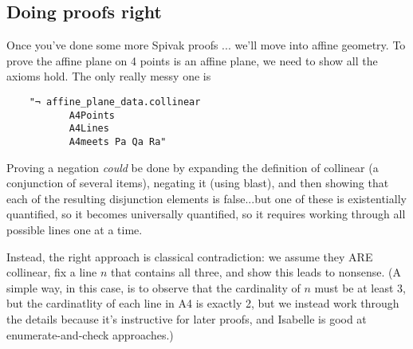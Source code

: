 \subsection{Doing proofs right}
Once you've done some more Spivak proofs ... we'll move into affine geometry. 
To prove the affine plane on 4 points is an affine plane, we need to show all the axioms hold. The only really messy one is 
\begin{verbatim}
    "¬ affine_plane_data.collinear
           A4Points
           A4Lines
           A4meets Pa Qa Ra"
\end{verbatim}
Proving a negation \textit{could} be done by expanding the definition of collinear (a conjunction of several items), negating it (using blast), and then showing that each of the resulting disjunction elements is false...but one of these is existentially quantified, so it becomes universally quantified, so it requires working through all possible lines one at a time. 

Instead, the right approach is classical contradiction: we assume they ARE collinear, fix a line $n$ that contains all three, and show this leads to nonsense. (A simple way, in this case, is to observe that the cardinality of $n$ must be at least 3, but the cardinatlity of each line in A4 is exactly 2, but we instead work through the details because it's instructive for later proofs, and Isabelle is good at enumerate-and-check approaches.) 


